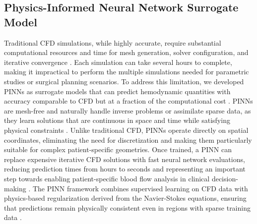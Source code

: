 ﻿\documentclass[12pt,a4paper]{article}
\theoremstyle{definition}
\numberwithin{equation}{section}
\begin{document}
\subsection{\label{PINN Methodology}{Physics-Informed Neural Network Surrogate Model}}
{

\hspace*{\parindent}Traditional CFD simulations, while highly accurate, require substantial computational resources and time for mesh generation, solver configuration, and iterative convergence \cite{57}. Each simulation can take several hours to complete, making it impractical to perform the multiple simulations needed for parametric studies or surgical planning scenarios. To address this limitation, we developed PINNs as surrogate models that can predict hemodynamic quantities with accuracy comparable to CFD but at a fraction of the computational cost \cite{92, 94}. PINNs are mesh-free and naturally handle inverse problems or assimilate sparse data, as they learn solutions that are continuous in space and time while satisfying physical constraints \cite{89}. Unlike traditional CFD, PINNs operate directly on spatial coordinates, eliminating the need for discretization and making them particularly suitable for complex patient-specific geometries. Once trained, a PINN can replace expensive iterative CFD solutions with fast neural network evaluations, reducing prediction times from hours to seconds and representing an important step towards enabling patient-specific blood flow analysis in clinical decision-making \cite{94}. The PINN framework combines supervised learning on CFD data with physics-based regularization derived from the Navier-Stokes equations, ensuring that predictions remain physically consistent even in regions with sparse training data \cite{93}.

}
\end{document}
